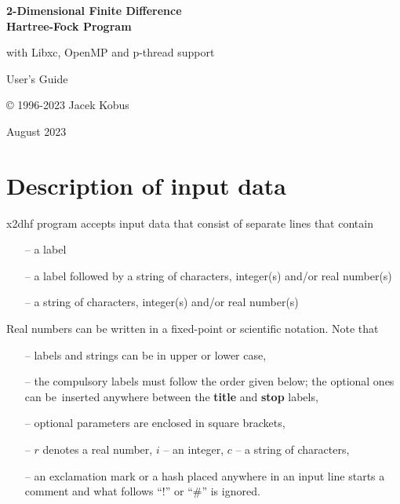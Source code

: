 \documentclass[10pt,a4paper]{article}
\newcommand{\clearemptydoublepage}{\newpage{\pagestyle{empty}\cleardoublepage}}
\begin{document}
\thispagestyle{empty}

\vspace*{4cm}
\begin{center}

{\LARGE\bf 2-Dimensional Finite Difference \\[10pt]
Hartree-Fock Program}

\vskip 0.5cm

{\large with Libxc, OpenMP and p-thread support }

\vskip 1.0cm

{\Large User's Guide}

\vskip 1.0cm

{\large  © 1996-2023 Jacek Kobus \\[10pt]}

{ August 2023\\[10pt]}

\end{center}

\clearemptydoublepage
\tableofcontents
\thispagestyle{empty}
\clearemptydoublepage
\section{Description of input data}

x2dhf program accepts input data that consist of separate lines that contain
\begin{itemize}
\item[--] a label
\item[--] a label followed by a string of characters, integer(s)
  and/or real number(s)
\item[--] a string of characters, integer(s) and/or real number(s)
\end{itemize}
Real numbers can be written in a fixed-point or scientific notation.
\noindent
Note that
\begin{itemize}
\item[--] labels and strings can be in upper or lower case,

\item[--] the compulsory labels must follow the order given below; the
  optional ones can be~inserted anywhere between the \textbf{title}
  and \textbf{stop} labels,

\item[--] optional parameters are enclosed in square brackets,

\item[--] $r$ denotes a real number, $i$ -- an integer, $c$ -- a string
          of characters,

\item[--] an exclamation mark or a hash placed anywhere in an input
  line starts a comment and what follows ``!'' or ``\#'' is ignored.

\end{itemize}
\end{document}
